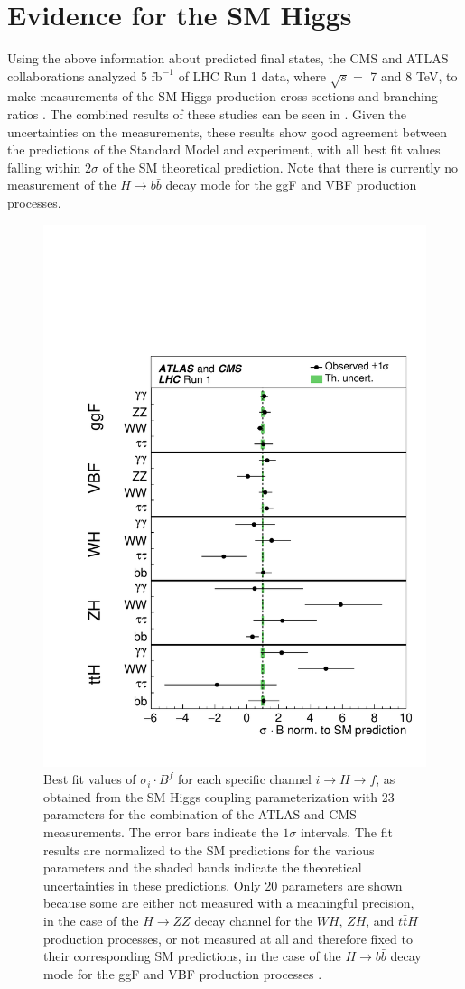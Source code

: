 \section{Evidence for the SM Higgs} \label{sec:higgs:higgs_evidence}

Using the above information about predicted final states, the CMS and ATLAS
collaborations analyzed 5 $\text{fb}^{-1}$ of LHC Run 1 data, where $\sqrt{s} =
$ 7 and 8 TeV, to make measurements of the SM Higgs production cross sections
and branching ratios \cite{Khachatryan:2016vau}.  The combined results of these
studies can be seen in
.
Given the uncertainties on the measurements, these results show good agreement
between the predictions of the Standard Model and experiment, with all best fit
values falling within $2\sigma$ of the SM theoretical prediction. Note that
there is currently no measurement of the $H \rightarrow b\bar{b}$ decay mode
for the ggF and VBF production processes.

\begin{figure}[!htbp]
  \begin{center}
    \includegraphics[width=0.5\linewidth]{figures/higgs/higgs_production_measurement.pdf}
    \caption{ Best fit values of $\sigma_{i} \cdot B^{f}$ for each specific channel $i \rightarrow H \rightarrow f$, as obtained from the SM Higgs coupling parameterization with 23 parameters for the combination of the ATLAS and CMS measurements. The error bars indicate the $1\sigma$ intervals. The fit results are normalized to the SM predictions for the various parameters and the shaded bands indicate the theoretical uncertainties in these predictions. Only 20 parameters are shown because some are either not measured with a meaningful precision, in the case of the $H \rightarrow ZZ$ decay channel for the $WH$, $ZH$, and $t\bar{t}H$ production processes, or not measured at all and therefore fixed to their corresponding SM predictions, in the case of the $H \rightarrow b\bar{b}$ decay mode for the ggF and VBF production processes \cite{Khachatryan:2016vau}.}
    \label{fig:higgs_production_measurement}
  \end{center}
\end{figure}

